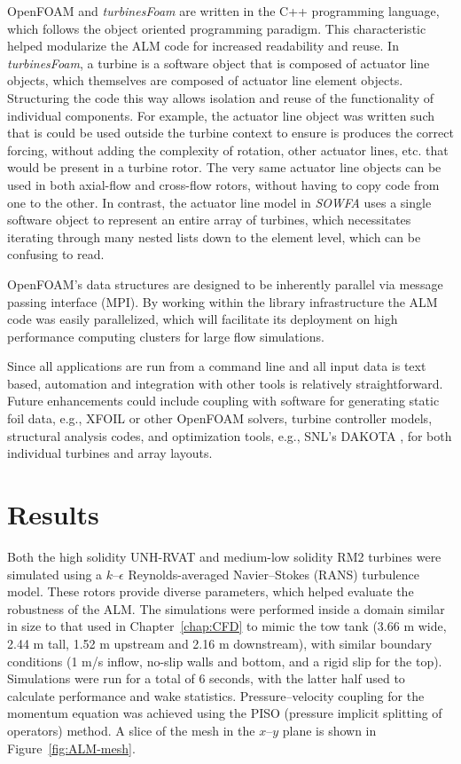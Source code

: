 OpenFOAM and \textit{turbinesFoam} are written in the C++ programming language,
which follows the object oriented programming paradigm. This characteristic
helped modularize the ALM code for increased readability and reuse. In
\textit{turbinesFoam}, a turbine is a software object that is composed of
actuator line objects, which themselves are composed of actuator line element
objects. Structuring the code this way allows isolation and reuse of the
functionality of individual components. For example, the actuator line object
was written such that is could be used outside the turbine context to ensure is
produces the correct forcing, without adding the complexity of rotation, other
actuator lines, etc. that would be present in a turbine rotor. The very same
actuator line objects can be used in both axial-flow and cross-flow rotors,
without having to copy code from one to the other. In contrast, the actuator
line model in \textit{SOWFA} uses a single software object to represent an
entire array of turbines, which necessitates iterating through many nested lists
down to the element level, which can be confusing to read.

OpenFOAM's data structures are designed to be inherently parallel via message
passing interface (MPI). By working within the library infrastructure the ALM
code was easily parallelized, which will facilitate its deployment on high
performance computing clusters for large flow simulations.

Since all applications are run from a command line and all input data is text
based, automation and integration with other tools is relatively
straightforward. Future enhancements could include coupling with software for
generating static foil data, e.g., XFOIL or other OpenFOAM solvers, turbine
controller models, structural analysis codes, and optimization tools, e.g.,
SNL's DAKOTA \cite{AdamsBaumanBohnhoffEtAl2009}, for both individual turbines
and array layouts.


\section{Results}

Both the high solidity UNH-RVAT and medium-low solidity RM2 turbines were
simulated using a $k$--$\epsilon$ Reynolds-averaged Navier--Stokes (RANS)
turbulence model. These rotors provide diverse parameters, which helped evaluate
the robustness of the ALM. The simulations were performed inside a domain
similar in size to that used in Chapter~\ref{chap:CFD} to mimic the tow tank
(3.66 m wide, 2.44 m tall, 1.52 m upstream and 2.16 m downstream), with similar
boundary conditions (1 m/s inflow, no-slip walls and bottom, and a rigid slip
for the top). Simulations were run for a total of 6 seconds, with the latter
half used to calculate performance and wake statistics. Pressure--velocity
coupling for the momentum equation was achieved using the PISO (pressure
implicit splitting of operators) method. A slice of the mesh in the $x$--$y$
plane is shown in Figure~\ref{fig:ALM-mesh}.

